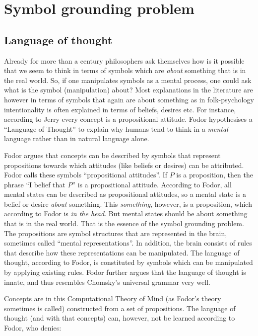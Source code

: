 \section{Symbol grounding problem}

\subsection{Language of thought}

Already for more than a century philosophers ask themselves how is it possible that we seem to think in terms of symbols which are {\em about} something that is in the real world. So, if one manipulates symbols as a mental process, one could ask what is the symbol (manipulation) about? Most explanations in the literature are however in terms of symbols that again are about something as in folk-psychology intentionality is often explained in terms of beliefs, desires etc. For instance, according to Jerry \citet{fodor:1975} every concept is a propositional attitude. Fodor hypothesises a ``Language of Thought'' to explain why humans tend to think in a {\em mental} language rather than in natural language alone.

Fodor argues that concepts can be described by symbols that represent propositions towards which attitudes (like beliefs or desires) can be attributed. Fodor calls these symbols ``propositional attitudes''. If $P$ is a proposition, then the phrase ``I belief that $P$'' is a propositional attitude. According to Fodor, all mental states can be described as propositional attitudes, so a mental state is a belief or desire {\em about} something. This {\em something}, however, is a proposition, which according to Fodor is {\em in the head}. But mental states should be about something that is in the real world. That is the essence of the symbol grounding problem. The propositions are symbol structures that are represented in the brain, sometimes called ``mental representations''. In addition, the brain consists of rules that describe how these representations can be manipulated. The language of thought, according to Fodor, is constituted by symbols which can be manipulated by applying existing rules. Fodor further argues that the language of thought is innate, and thus resembles Chomsky's universal grammar very well.

Concepts are in this Computational Theory of Mind (as Fodor's theory sometimes is called) constructed from a set of propositions. The language of thought (and with that concepts) can, however, not be learned according to Fodor, who denies:

